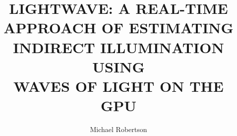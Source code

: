 \documentclass[12pt]{report}
\author{Michael Robertson}
\title{LIGHTWAVE: A REAL-TIME \\
	APPROACH OF ESTIMATING \\
	INDIRECT ILLUMINATION USING \\
	WAVES OF LIGHT ON THE GPU}
\begin{document}

\maketitle




\tableofcontents



\listoftables


\listoffigures

%

%


\startbody








%




%
%
\end{document}

